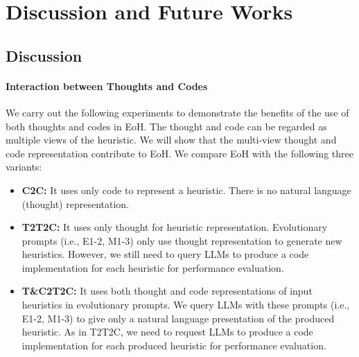 \section{Discussion and Future Works}\label{sec:discussion}

\subsection{Discussion}
\paragraph{Interaction between Thoughts and Codes}
We carry out the following experiments to demonstrate the benefits of the use of both thoughts and codes in EoH. The thought and code can be regarded as multiple views of the heuristic. We will show that the multi-view thought and code representation contribute to EoH. %
We compare EoH with the following three variants: 
\begin{itemize}
    \item \textbf{C2C:} It uses only code to represent a heuristic. There is no natural language (thought) representation.
    \item \textbf{T2T2C:} It uses only thought for heuristic representation. Evolutionary prompts (i.e., E1-2, M1-3) only use thought representation to generate new heuristics. However, we still need to query LLMs to produce a code implementation for each heuristic for performance evaluation.  
    \item \textbf{T\&C2T2C:} It uses both thought and code representations of input heuristics in evolutionary prompts. We query LLMs with these prompts (i.e., E1-2, M1-3) to give only a natural language presentation of the produced heuristic. As in T2T2C, we need to request LLMs to produce a code implementation for each produced heuristic for performance evaluation.
    



\end{itemize}

